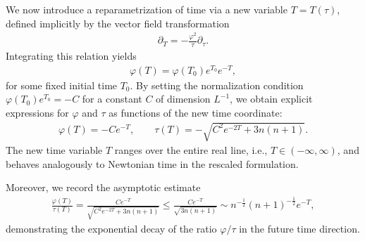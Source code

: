 \documentclass{amsart}
\begin{document}
\noindent We now introduce a reparametrization of time via a new variable $T = T(\tau)$, defined implicitly by the vector field transformation
\begin{align} \label{eq:timechange}
\partial_T = -\frac{\varphi^2}{\tau} \partial_\tau.
\end{align}
Integrating this relation yields
\begin{align} \label{eq:ex1}
\varphi(T) = \varphi(T_0) e^{T_0} e^{-T},
\end{align}
for some fixed initial time $T_0$. By setting the normalization condition $\varphi(T_0) e^{T_0} = -C$ for a constant $C$ of dimension $L^{-1}$, we obtain explicit expressions for $\varphi$ and $\tau$ as functions of the new time coordinate:
\begin{align} \label{eq:ex2}
\varphi(T) = -Ce^{-T}, \qquad \tau(T) = -\sqrt{C^{2}e^{-2T} + 3n(n+1)}.
\end{align}
The new time variable $T$ ranges over the entire real line, i.e., $T \in (-\infty, \infty)$, and behaves analogously to Newtonian time in the rescaled formulation. 

\noindent Moreover, we record the asymptotic estimate
\begin{align} \label{eq:asymptotic}
\frac{\varphi(T)}{\tau(T)} = \frac{Ce^{-T}}{\sqrt{C^{2}e^{-2T} + 3n(n+1)}} \leq \frac{Ce^{-T}}{\sqrt{3n(n+1)}} \sim n^{-\frac{1}{2}}(n+1)^{-\frac{1}{2}}e^{-T},
\end{align}
demonstrating the exponential decay of the ratio $\varphi/\tau$ in the future time direction.
\end{document}
